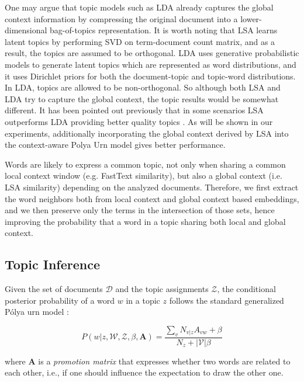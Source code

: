 \documentclass[letterpaper]{article}
\begin{document}
One may argue that topic models such as LDA already captures the global context information by compressing the original document into a lower-dimensional bag-of-topics representation. It is worth noting that LSA learns latent topics by performing SVD on term-document count matrix, and as a result, the topics are assumed to be orthogonal. LDA uses generative probabilistic models to generate latent topics which are represented as word distributions, and it uses Dirichlet priors for both the document-topic and topic-word distributions. In LDA, topics are allowed to be non-orthogonal. So although both LSA and LDA try to capture the global context, the topic results would be somewhat different. It has been pointed out previously that in some scenarios LSA outperforms LDA providing better quality topics \cite{Bergamaschi15}. As will be shown in our experiments, additionally incorporating the global context derived by LSA into the context-aware Polya Urn model gives better performance.

Words are likely to express a common topic, not only when sharing a common local context window (e.g. FastText similarity), but also a global context (i.e. LSA similarity) depending on the analyzed documents.
Therefore, we first extract the word neighbors both from local context and global context based embeddings, and we then preserve only the terms in the intersection of those sets, hence improving the probability that a word in a topic sharing both local and global context.

\subsection{Topic Inference}

Given the set of documents $\mathcal{D}$ and the topic assignments $\mathcal{Z}$, the conditional posterior probability of a word $w$ in a topic $z$ follows the standard generalized P\'{o}lya urn model \cite{Mimno11}:

\begin{equation}
  P(w |z,\mathcal{W},\mathcal{Z},\beta,\mathbf{A}) = \frac{\sum_{v} N_{v|z} A_{vw} + \beta}{N_z + |\mathcal{V}|\beta}
\label{eq:gpumodel}
\end{equation}

where $\mathbf{A}$ is a \textit{promotion matrix} that expresses whether two words are related to each other, i.e., if one should influence the expectation to draw the other one.
\end{document}
